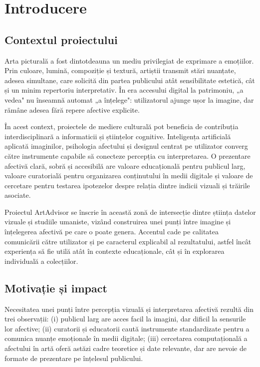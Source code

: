 \chapter{Introducere}
\label{ch:introducere}

\section{Contextul proiectului}
\label{sec:intro-context}

Arta picturală a fost dintotdeauna un mediu privilegiat de exprimare a emoțiilor. Prin culoare, lumină, compoziție și textură, artiștii transmit stări nuanțate, adesea simultane, care solicită din partea publicului atât sensibilitate estetică, cât și un minim repertoriu interpretativ. În era accesului digital la patrimoniu, „a vedea" nu înseamnă automat „a înțelege": utilizatorul ajunge ușor la imagine, dar rămâne adesea fără repere afective explicite.

În acest context, proiectele de mediere culturală pot beneficia de contribuția interdisciplinară a informaticii și științelor cognitive. Inteligența artificială aplicată imaginilor, psihologia afectului și designul centrat pe utilizator converg către instrumente capabile să conecteze percepția cu interpretarea. O prezentare afectivă clară, sobră și accesibilă are valoare educațională pentru publicul larg, valoare curatorială pentru organizarea conținutului în medii digitale și valoare de cercetare pentru testarea ipotezelor despre relația dintre indicii vizuali și trăirile asociate.

Proiectul ArtAdvisor se înscrie în această zonă de intersecție dintre știința datelor vizuale și studiile umaniste, vizând construirea unei punți între imagine și înțelegerea afectivă pe care o poate genera. Accentul cade pe calitatea comunicării către utilizator și pe caracterul explicabil al rezultatului, astfel încât experiența să fie utilă atât în contexte educaționale, cât și în explorarea individuală a colecțiilor.

\section{Motivație și impact}
\label{sec:intro-motivatie}

Necesitatea unei punți între percepția vizuală și interpretarea afectivă rezultă din trei observații: (i) publicul larg are acces facil la imagini, dar dificil la sensurile lor afective; (ii) curatorii și educatorii caută instrumente standardizate pentru a comunica nuanțe emoționale în medii digitale; (iii) cercetarea computațională a afectului în artă oferă astăzi cadre teoretice și date relevante, dar are nevoie de formate de prezentare pe înțelesul publicului.

